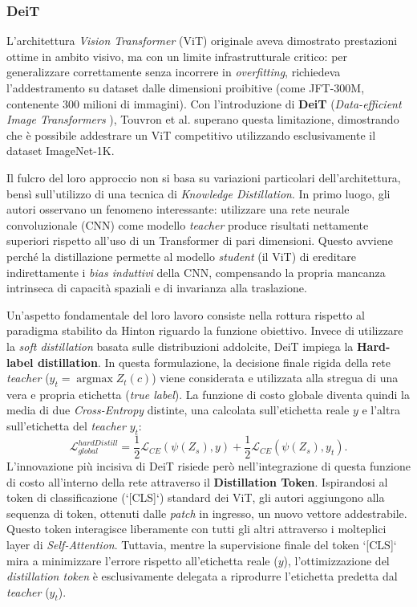 \subsubsection{DeiT}
L'architettura \textit{Vision Transformer} (ViT) originale aveva dimostrato
prestazioni ottime in ambito visivo, ma con un limite infrastrutturale critico:
per generalizzare correttamente senza incorrere in \textit{overfitting},
richiedeva l'addestramento su dataset dalle dimensioni proibitive (come
JFT-300M, contenente 300 milioni di immagini). Con l'introduzione di
\textbf{DeiT} (\textit{Data-efficient Image Transformers}
\cite{touvron2021trainingdataefficientimagetransformers}), Touvron et al.
superano questa limitazione, dimostrando che è possibile addestrare un ViT
competitivo utilizzando esclusivamente il dataset ImageNet-1K. \par
Il fulcro del loro approccio non si basa su variazioni particolari
dell'architettura, bensì sull'utilizzo di una tecnica di \textit{Knowledge
    Distillation}. In primo luogo, gli autori osservano un fenomeno interessante:
utilizzare una rete neurale convoluzionale (CNN) come modello \textit{teacher}
produce risultati nettamente superiori rispetto all'uso di un Transformer di
pari dimensioni. Questo avviene perché la distillazione permette al modello
\textit{student} (il ViT) di ereditare indirettamente i \textit{bias induttivi}
della CNN, compensando la propria mancanza intrinseca di capacità spaziali e di
invarianza alla traslazione. \par
Un'aspetto fondamentale del loro lavoro consiste nella rottura rispetto al
paradigma stabilito da Hinton \cite{hinton2015distilling} riguardo la funzione
obiettivo. Invece di utilizzare la \textit{soft distillation} basata sulle
distribuzioni addolcite, DeiT impiega la \textbf{Hard-label distillation}. In
questa formulazione, la decisione finale rigida della rete \textit{teacher}
($y_t = \operatorname{argmax} Z_t(c)$) viene considerata e utilizzata alla
stregua di una vera e propria etichetta (\textit{true label}). La funzione di
costo globale diventa quindi la media di due \textit{Cross-Entropy} distinte,
una calcolata sull'etichetta reale $y$ e l'altra sull'etichetta del
\textit{teacher} $y_t$:
\begin{equation}
    \mathcal{L}_{global}^{hardDistill} = \frac{1}{2}\mathcal{L}_{CE}(\psi(Z_s), y) + \frac{1}{2}\mathcal{L}_{CE}(\psi(Z_s), y_t).
\end{equation}
L'innovazione più incisiva di DeiT risiede però nell'integrazione di questa funzione di costo all'interno della rete attraverso il \textbf{Distillation Token}. Ispirandosi al token di classificazione (`[CLS]`) standard dei ViT, gli autori aggiungono alla sequenza di token,  ottenuti dalle \textit{patch} in ingresso, un nuovo vettore addestrabile. Questo token interagisce liberamente con tutti gli altri attraverso i molteplici layer di \textit{Self-Attention}. Tuttavia, mentre la supervisione finale del token `[CLS]` mira a minimizzare l'errore rispetto all'etichetta reale ($y$), l'ottimizzazione del \textit{distillation token} è esclusivamente delegata a riprodurre l'etichetta predetta dal \textit{teacher} ($y_t$). \par
